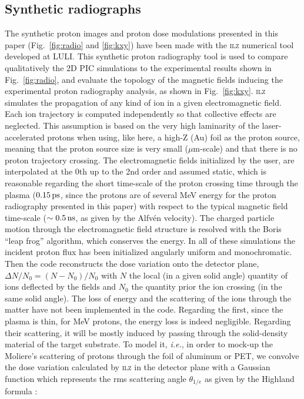 \documentclass[aps,twocolumn,showpacs,superscriptaddress]{revtex4}
\begin{document}
\subsection*{Synthetic radiographs}
The synthetic proton images and proton dose modulations presented in this paper (Fig.~\ref{fig:radio} and  \ref{fig:kxy}) have been made with the \textsc{ilz} numerical tool developed at LULI. This synthetic proton radiography tool is used to compare qualitatively the 2D PIC simulations to the experimental results shown in Fig.~\ref{fig:radio}, and evaluate the topology of the magnetic fields inducing the experimental proton radiography analysis, as shown in Fig.~\ref{fig:kxy}.
\textsc{ilz} simulates the propagation of any kind of ion in a given electromagnetic field. Each ion trajectory is computed independently so that collective effects are neglected. This assumption is based on the very high laminarity of the laser-accelerated protons \cite{PRL_Cowan_2004, PRL_Fuchs_2003} when using, like here, a high-Z (Au) foil as the proton source, meaning that the proton source size is very small ($\mu$m-scale) and that there is no proton trajectory crossing. The electromagnetic  fields   initialized by the user, are interpolated at the 0th up to the 2nd order and assumed static, which is reasonable regarding the short time-scale of the proton crossing time through the plasma ($0.15\,\rm ps$, since the protons are of several MeV energy for the proton radiography presented in this paper) with respect to the typical magnetic field time-scale ($\sim 0.5\,\rm ns$, as given by the Alfv\'en velocity). The charged particle motion through the electromagnetic  field structure is resolved with the Boris “leap frog” algorithm, which conserves the energy. In all of these simulations the incident proton flux has been initialized angularly uniform and monochromatic. Then the code reconstructs the dose variation onto the detector plane, $\Delta N/N_0= (N- N_0)/N_0$ with $N$ the local (in a given solid angle) quantity of ions deflected by the fields and $N_0$ the quantity prior the ion crossing  (in the same solid angle). 
The loss of energy and the scattering of the ions through the matter have not been implemented in the code. Regarding the first, since the plasma is thin, for MeV protons, the energy loss is indeed negligible. Regarding their scattering, it will be mostly induced by passing through the solid-density material of the target substrate. To model it, \emph{i.e.}, in order to mock-up the Moliere's scattering of protons through the foil of aluminum or PET, we convolve the dose variation calculated by \textsc{ilz} in the detector plane with a Gaussian function which represents the rms scattering angle $\theta_{1/e}$ as given by the Highland formula \cite{NIM_Highland_1975}:
\end{document}
